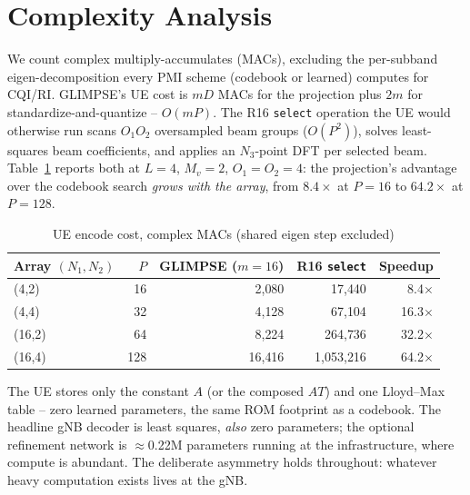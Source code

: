 \documentclass[conference]{IEEEtran}
\begin{document}
\section{Complexity Analysis}
\label{sec:complexity}
We count complex multiply-accumulates (MACs), excluding the per-subband eigen-decomposition every PMI scheme (codebook or learned) computes for CQI/RI. GLIMPSE's UE cost is $mD$ MACs for the projection plus $2m$ for standardize-and-quantize -- $O(mP)$. The R16 \texttt{select} operation the UE would otherwise run scans $O_1O_2$ oversampled beam groups ($O(P^2)$), solves least-squares beam coefficients, and applies an $N_3$-point DFT per selected beam. Table~\ref{tab:complexity} reports both at $L{=}4$, $M_v{=}2$, $O_1{=}O_2{=}4$: the projection's advantage over the codebook search \emph{grows with the array}, from $8.4\times$ at $P{=}16$ to $64.2\times$ at $P{=}128$.

\begin{table}[t]
\centering
\caption{UE encode cost, complex MACs (shared eigen step excluded)}
\label{tab:complexity}
\begin{tabular}{@{}lrrrr@{}}
\toprule
Array $(N_1,N_2)$ & $P$ & GLIMPSE ($m{=}16$) & R16 \texttt{select} & Speedup \\
\midrule
(4,2)   & 16  & 2{,}080   & 17{,}440    & 8.4$\times$ \\
(4,4)   & 32  & 4{,}128   & 67{,}104    & 16.3$\times$ \\
(16,2)  & 64  & 8{,}224   & 264{,}736   & 32.2$\times$ \\
(16,4)  & 128 & 16{,}416  & 1{,}053{,}216 & 64.2$\times$ \\
\bottomrule
\end{tabular}
\end{table}

The UE stores only the constant $A$ (or the composed $A T$) and one Lloyd--Max table -- zero learned parameters, the same ROM footprint as a codebook. The headline gNB decoder is least squares, \emph{also} zero parameters; the optional refinement network is $\approx$0.22M parameters running at the infrastructure, where compute is abundant. The deliberate asymmetry holds throughout: whatever heavy computation exists lives at the gNB.
\end{document}
